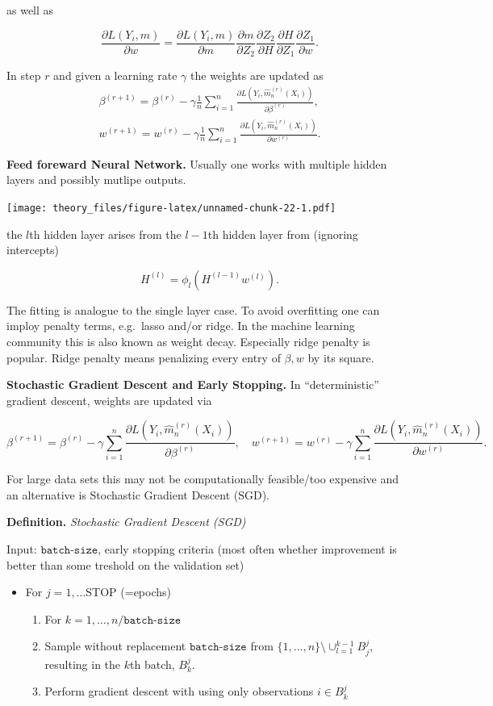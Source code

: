 \documentclass[a4paper,10pt,openany]{book}
\providecommand{\tightlist}{%
 \setlength{\itemsep}{0pt}\setlength{\parskip}{0pt}}
\begin{document}
as well as

\[
\frac{\partial L(Y_i,m)}{\partial w}=\frac{\partial L(Y_i,m)}{\partial m}\frac{\partial m}{\partial Z_2} \frac{\partial Z_2}{\partial H} \frac{\partial H}{\partial Z_1}\frac{\partial Z_1}{\partial w}.
\]

In step \(r\) and given a learning rate \(\gamma\) the weights are updated as
\begin{align*}
\beta^{(r+1)}= \beta^{(r)} -\gamma \frac 1 n \sum_{i=1}^n\frac{\partial L(Y_i,\hat m_n^{(r)}(X_i))}{\partial \beta^{(r)}},  \\
w^{(r+1)}= w^{(r)} -\gamma  \frac 1 n \sum_{i=1}^n \frac{\partial L(Y_i,\hat m_n^{(r)}(X_i))}{\partial w^{(r)}}. 
\end{align*}

\textbf{Feed foreward Neural Network.} Usually one works with multiple hidden layers and possibly mutlipe outputs.

\texttt{[image: theory\_files/figure-latex/unnamed-chunk-22-1.pdf]}

the \(l\)th hidden layer arises from the \(l-1\)th hidden layer from (ignoring intercepts)

\[
H^{(l)}=\phi_l(H^{(l-1)}w^{(l)}).
\]

The fitting is analogue to the single layer case. To avoid overfitting one can imploy penalty terms, e.g.~lasso and/or ridge. In the machine learning community this is also known as weight decay. Especially ridge penalty is popular. Ridge penalty means penalizing every entry of \(\beta, w\) by its square.

\textbf{Stochastic Gradient Descent and Early Stopping.} In ``deterministic'' gradient descent, weights are updated via

\[
\beta^{(r+1)}= \beta^{(r)} -\gamma \sum_{i=1}^n\frac{\partial L(Y_i,\hat m_n^{(r)}(X_i))}{\partial \beta^{(r)}},  \quad
w^{(r+1)}= w^{(r)} -\gamma  \sum_{i=1}^n \frac{\partial L(Y_i,\hat m_n^{(r)}(X_i))}{\partial w^{(r)}}.
\]

For large data sets this may not be computationally feasible/too expensive and an alternative is Stochastic Gradient Descent (SGD).

\textbf{Definition.} \emph{Stochastic Gradient Descent (SGD)}

Input: \(\texttt{batch-size}\), early stopping criteria (most often whether improvement is better than some treshold on the validation set)

\begin{itemize}
\tightlist
\item
  For \(j=1,\dots\)STOP (=epochs)

  \begin{enumerate}
  \def\labelenumi{\arabic{enumi}.}
  \tightlist
  \item
    For \(k=1,\dots, n/\texttt{batch-size}\)
  \item
    Sample without replacement \(\texttt{batch-size}\) from \(\{1,\dots,n\}\setminus \cup_{l=1}^{k-1}B_j^j\), resulting in the \(k\)th batch, \(B_k^j\).
  \item
    Perform gradient descent with using only observations \(i \in B_k^j\)
  \end{enumerate}
\end{itemize}
\end{document}

